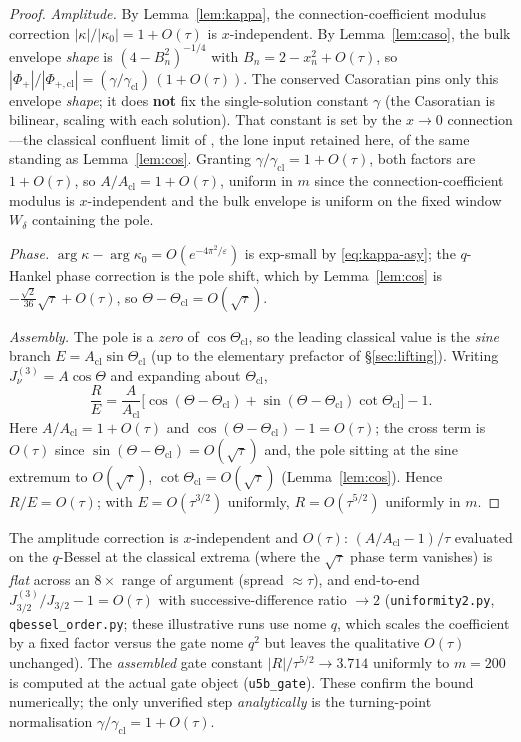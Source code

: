 \begin{proof}
\emph{Amplitude.} By Lemma~\ref{lem:kappa}, the connection-coefficient modulus correction
$|\kappa|/|\kappa_0|=1+O(\tau)$ is $x$-independent. By Lemma~\ref{lem:caso}, the bulk envelope
\emph{shape} is $(4-B_n^2)^{-1/4}$ with $B_n=2-x_n^2+O(\tau)$, so
$|\Phi_+|/|\Phi_{+,\mathrm{cl}}|=(\gamma/\gamma_{\mathrm{cl}})\,(1+O(\tau))$. The conserved
Casoratian pins only this envelope \emph{shape}; it does \textbf{not} fix the single-solution
constant $\gamma$ (the Casoratian is bilinear, scaling with each solution). That constant is
set by the $x\to0$ connection---the classical confluent limit of \cite[Thm.~3.3]{Morita2011},
the lone input retained here, of the same standing as Lemma~\ref{lem:cos}. Granting
$\gamma/\gamma_{\mathrm{cl}}=1+O(\tau)$, both factors are $1+O(\tau)$, so $A/A_{\mathrm{cl}}
=1+O(\tau)$, uniform in $m$ since the connection-coefficient modulus is $x$-independent and the
bulk envelope is uniform on the fixed window $W_\delta$ containing the pole.

\emph{Phase.} $\arg\kappa-\arg\kappa_0=O(e^{-4\pi^2/\varepsilon})$ is exp-small by
\eqref{eq:kappa-asy}; the $q$-Hankel phase correction is the pole shift, which by
Lemma~\ref{lem:cos} is $-\tfrac{\sqrt2}{36}\sqrt\tau+O(\tau)$, so
$\Theta-\Theta_{\mathrm{cl}}=O(\sqrt\tau)$.

\emph{Assembly.} The pole is a \emph{zero} of $\cos\Theta_{\mathrm{cl}}$, so the leading
classical value is the \emph{sine} branch $E=A_{\mathrm{cl}}\sin\Theta_{\mathrm{cl}}$ (up to the
elementary prefactor of \S\ref{sec:lifting}). Writing $J^{(3)}_\nu=A\cos\Theta$ and expanding
about $\Theta_{\mathrm{cl}}$,
\[
   \frac{R}{E}=\frac{A}{A_{\mathrm{cl}}}\Big[\cos(\Theta-\Theta_{\mathrm{cl}})
     +\sin(\Theta-\Theta_{\mathrm{cl}})\cot\Theta_{\mathrm{cl}}\Big]-1 .
\]
Here $A/A_{\mathrm{cl}}=1+O(\tau)$ and $\cos(\Theta-\Theta_{\mathrm{cl}})-1=O(\tau)$; the cross
term is $O(\tau)$ since $\sin(\Theta-\Theta_{\mathrm{cl}})=O(\sqrt\tau)$ and, the pole sitting
at the sine extremum to $O(\sqrt\tau)$, $\cot\Theta_{\mathrm{cl}}=O(\sqrt\tau)$
(Lemma~\ref{lem:cos}). Hence $R/E=O(\tau)$; with $E=O(\tau^{3/2})$ uniformly,
$R=O(\tau^{5/2})$ uniformly in $m$.
\end{proof}

\begin{remark}[\checked]
The amplitude correction is $x$-independent and $O(\tau)$: $(A/A_{\mathrm{cl}}-1)/\tau$
evaluated on the $q$-Bessel at the classical extrema (where the $\sqrt\tau$ phase term
vanishes) is \emph{flat} across an $8\times$ range of argument (spread $\approx\tau$),
and end-to-end $J^{(3)}_{3/2}/J_{3/2}-1=O(\tau)$ with successive-difference ratio $\to2$
(\texttt{uniformity2.py}, \texttt{qbessel\_order.py}; these illustrative runs use nome $q$,
which scales the coefficient by a fixed factor versus the gate nome $q^2$ but leaves the
qualitative $O(\tau)$ unchanged). The \emph{assembled} gate constant
$|R|/\tau^{5/2}\to3.714$ uniformly to $m=200$ is computed at the actual gate object
(\texttt{u5b\_gate}). These confirm the bound numerically; the only unverified step
\emph{analytically} is the turning-point normalisation $\gamma/\gamma_{\mathrm{cl}}=1+O(\tau)$.
\end{remark}

